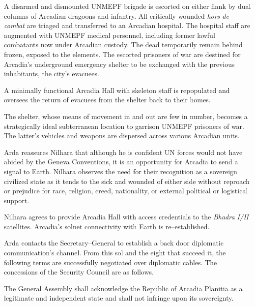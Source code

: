 

A disarmed and dismounted UNMEPF brigade is escorted on either flank by dual columns of Arcadian dragoons and infantry. All critically wounded {\it hors de combat} are triaged and transferred to an Arcadian hospital. The hospital staff are augmented with UNMEPF medical personnel, including former lawful combatants now under Arcadian custody. The dead temporarily remain behind frozen, exposed to the elements. The escorted prisoners of war are destined for Arcadia's underground emergency shelter to be exchanged with the previous inhabitants, the city's evacuees.

A minimally functional Arcadia Hall with skeleton staff is repopulated and oversees the return of evacuees from the shelter back to their homes.

The shelter, whose means of movement in and out are few in number, becomes a strategically ideal subterranean location to garrison UNMEPF prisoners of war. The latter's vehicles and weapons are dispersed across various Arcadian units.

Arda reassures Nilhara that although he is confident UN forces would not have abided by the Geneva Conventions, it is an opportunity for Arcadia to send a signal to Earth. Nilhara observes the need for their recognition as a sovereign civilized state as it tends to the sick and wounded of either side without reproach or prejudice for race, religion, creed, nationality, or external political or logistical support.
\StopTimelineDate

Nilhara agrees to provide Arcadia Hall with access credentials to the {\it Bhadra I/II} satellites. Arcadia's solnet connectivity with Earth is re--established.

Arda contacts the Secretary--General to establish a back door diplomatic communication's channel. From this sol and the eight that succeed it, the following terms are successfully negotiated over diplomatic cables. The concessions of the Security Council are as follows.

\startitemize[R]
\item The General Assembly shall acknowledge the Republic of Arcadia Planitia as a legitimate and independent state and shall not infringe upon its sovereignty.

